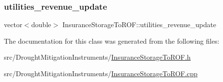 \subsubsection{\texorpdfstring{utilities\+\_\+revenue\+\_\+update}{utilities\_revenue\_update}}
{\footnotesize\ttfamily vector$<$double$>$ Insurance\+Storage\+To\+R\+O\+F\+::utilities\+\_\+revenue\+\_\+update\hspace{0.3cm}{\ttfamily [private]}}



The documentation for this class was generated from the following files\+:\begin{DoxyCompactItemize}
\item 
src/\+Drought\+Mitigation\+Instruments/\mbox{\hyperlink{InsuranceStorageToROF_8h}{Insurance\+Storage\+To\+R\+O\+F.\+h}}\item 
src/\+Drought\+Mitigation\+Instruments/\mbox{\hyperlink{InsuranceStorageToROF_8cpp}{Insurance\+Storage\+To\+R\+O\+F.\+cpp}}\end{DoxyCompactItemize}
